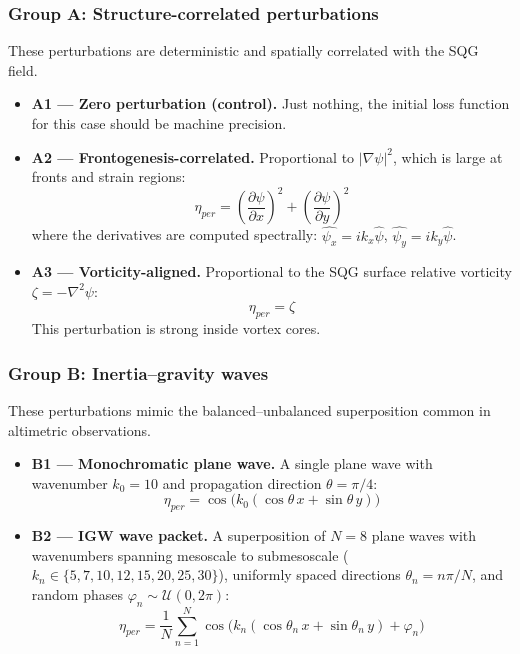 \documentclass[../SQG_notes.tex]{subfiles}
\begin{document}
    \subsubsection{Group A: Structure-correlated perturbations}
    These perturbations are deterministic and spatially correlated with the SQG field.
    \begin{itemize}
        \item \textbf{A1 --- Zero perturbation (control).} Just nothing, the initial loss function for this case should be machine precision. 

        \item \textbf{A2 --- Frontogenesis-correlated.} Proportional to $|\nabla \psi|^2$, which is large at fronts and strain regions:
        \[ \eta_{per} = \left(\frac{\partial \psi}{\partial x}\right)^2 + \left(\frac{\partial \psi}{\partial y}\right)^2 \]
        where the derivatives are computed spectrally:
        $\widehat{\psi_x} = i k_x \hat{\psi}$, \quad $\widehat{\psi_y} = i k_y \hat{\psi}$.

        \item \textbf{A3 --- Vorticity-aligned.} Proportional to the SQG surface relative vorticity $\zeta = -\nabla^2 \psi$:
        \[ \eta_{per} = \zeta\]
        This perturbation is strong inside vortex cores.
    \end{itemize}

    \subsubsection{Group B: Inertia--gravity waves}
    These perturbations mimic the balanced--unbalanced superposition common in altimetric observations.
    \begin{itemize}
        \item \textbf{B1 --- Monochromatic plane wave.} A single plane wave with wavenumber $k_0 = 10$ and propagation direction $\theta = \pi/4$:
        \[ \eta_{per} = \cos\!\bigl(k_0 (\cos\theta\, x + \sin\theta\, y)\bigr) \]

        \item \textbf{B2 --- IGW wave packet.} A superposition of $N = 8$ plane waves with wavenumbers spanning mesoscale to submesoscale ($k_n \in \{5, 7, 10, 12, 15, 20, 25, 30\}$), uniformly spaced directions $\theta_n = n\pi / N$, and random phases $\varphi_n \sim \mathcal{U}(0, 2\pi)$:
        \[ \eta_{per} = \frac{1}{N} \sum_{n=1}^{N} \cos\!\bigl(k_n (\cos\theta_n\, x + \sin\theta_n\, y) + \varphi_n\bigr) \]
    \end{itemize}
\end{document}

